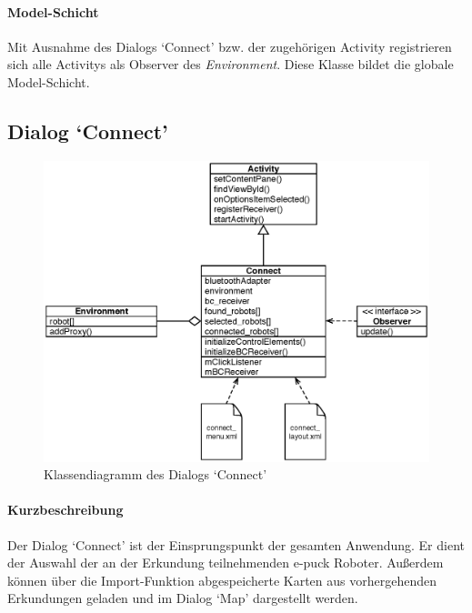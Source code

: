 \documentclass[10pt,a4paper]{article}
\begin{document}
	\paragraph*{Model-Schicht}
	Mit Ausnahme des Dialogs `Connect' bzw. der zugehörigen Activity registrieren sich alle Activitys als Observer des \textit{Environment}. Diese
	Klasse bildet die globale Model-Schicht.
	
	\subsection*{Dialog `Connect'}
	
	\begin{figure}[h]
			\centering
			\includegraphics[width=14cm]{images/entwurf_connect.eps}
  			\caption{Klassendiagramm des Dialogs `Connect'}
  	\end{figure}
	
	\paragraph*{Kurzbeschreibung} Der Dialog `Connect' ist der Einsprungspunkt der gesamten Anwendung. Er dient der Auswahl der an der Erkundung
	teilnehmenden e-puck Roboter. Außerdem können über die Import-Funktion abgespeicherte Karten aus vorhergehenden Erkundungen geladen und im Dialog
	`Map' dargestellt werden.
	
\end{document}
